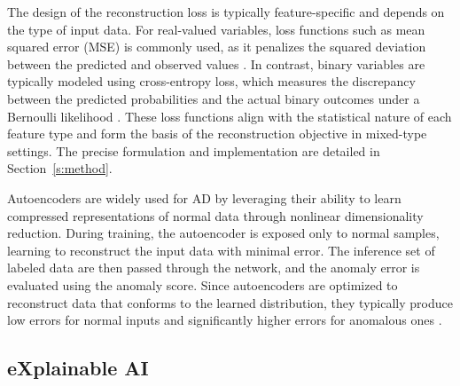 The design of the reconstruction loss is typically feature-specific and depends on the type of input data. For real-valued variables, loss functions such as mean squared error (MSE) is commonly used, as it penalizes the squared deviation between the predicted and observed values \citep{sakurada2014anomaly}. In contrast, binary variables are typically modeled using cross-entropy loss, which measures the discrepancy between the predicted probabilities and the actual binary outcomes under a Bernoulli likelihood \citep{hinton2006reducing}. These loss functions align with the statistical nature of each feature type and form the basis of the reconstruction objective in mixed-type settings. The precise formulation and implementation are detailed in Section~\ref{s:method}.

Autoencoders are widely used for AD by leveraging their ability to learn compressed representations of normal data through nonlinear dimensionality reduction. During training, the autoencoder is exposed only to normal samples, learning to reconstruct the input data with minimal error. The inference set of labeled data are then passed through the network, and the anomaly error is evaluated using the anomaly score. Since autoencoders are optimized to reconstruct data that conforms to the learned distribution, they typically produce low errors for normal inputs and significantly higher errors for anomalous ones \citep{sakurada2014anomaly}.

\subsection{eXplainable AI}

\iffalse\begin{itemize}
    \item Theoretical background on SHAP, LIME, and feature attribution methods.
    \item How privacy affects interpretability in DL models.
    \item Why KernelSHAP is chosen and its relevance to DP models.
\end{itemize}\fi